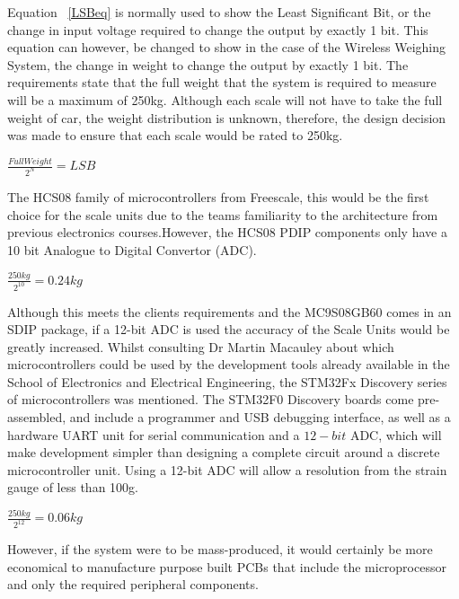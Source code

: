 Equation ~\ref{LSBeq} is normally used to show the Least Significant Bit, or the change in input voltage required to change the output by exactly 1 bit. This equation can however, be changed to show in the case of the Wireless Weighing System, the change in weight to change the output by exactly 1 bit.
The requirements state that the full weight that the system is required to measure will be a maximum of 250kg. Although each scale will not have to take the full weight of car, the weight distribution is unknown, therefore, the design decision was made to ensure that each scale would be rated to 250kg.  \\

\centerline{$\frac{Full Weight}{2^{N}} = LSB$}  \label{LSBeq2}

The HCS08 family of microcontrollers from Freescale, this would be the first choice for the scale units due to the teams familiarity to the architecture from previous electronics courses.However, the HCS08 PDIP components only have a 10 bit Analogue to Digital Convertor (ADC).\\

\centerline{$\frac{250kg}{2^{10}} = 0.24kg$} \label{LSBeq3}

Although this meets the clients requirements and the MC9S08GB60 comes in an SDIP package, if a 12-bit ADC is used the accuracy of the Scale Units would be greatly increased. Whilst consulting Dr Martin Macauley about which microcontrollers could be used by the development tools already available in the School of Electronics and Electrical Engineering, the STM32Fx Discovery series of microcontrollers was mentioned. The STM32F0 Discovery boards come pre-assembled, and include a programmer and USB debugging interface, as well as a hardware UART unit for serial communication and a $12-bit$ ADC, which will make development simpler than designing a complete circuit around a discrete microcontroller unit.  Using a 12-bit ADC will allow a resolution from the strain gauge of less than 100g. 
\\

\centerline{$\frac{250kg}{2^{12}} = 0.06kg$}

However, if the system were to be mass-produced, it would certainly be more economical to manufacture purpose built PCBs that include the microprocessor and only the required peripheral components. 
